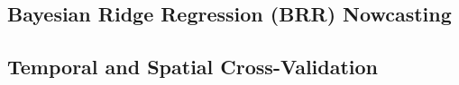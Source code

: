 \subsection{Bayesian Ridge Regression (BRR) Nowcasting}
\label{sec:brr_nowcasting}

\subsection{Temporal and Spatial Cross-Validation}
\label{sec:cross_validation}

